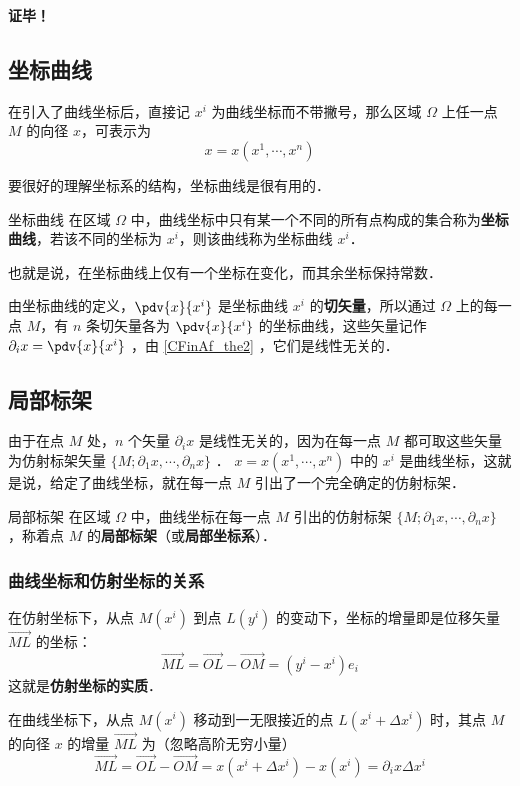 \textbf{证毕！}
\subsection{坐标曲线}
在引入了曲线坐标后，直接记 $x^i$ 为曲线坐标而不带撇号，那么区域 $\Omega$ 上任一点 $M$ 的向径 $x$，可表示为
\begin{equation}
x=x(x^1,\cdots,x^n)
\end{equation}

要很好的理解坐标系的结构，坐标曲线是很有用的．
\begin{definition}{坐标曲线}
在区域 $\Omega$ 中，曲线坐标中只有某一个不同的所有点构成的集合称为\textbf{坐标曲线}，若该不同的坐标为 $x^i$，则该曲线称为坐标曲线 $x^i$．
\end{definition}
也就是说，在坐标曲线上仅有一个坐标在变化，而其余坐标保持常数．

由坐标曲线的定义，$\pdv{x}{x^i}$ 是坐标曲线 $x^i$ 的\textbf{切矢量}，所以通过 $\Omega$ 上的每一点 $M$，有 $n$ 条切矢量各为 $\pdv{x}{x^i}$ 的坐标曲线，这些矢量记作 $\partial_i x=\pdv{x}{x^i}$ ，由 \autoref{CFinAf_the2} ，它们是线性无关的．
\subsection{局部标架}
由于在点 $M$ 处，$n$ 个矢量 $\partial_i x$ 是线性无关的，因为在每一点 $M$ 都可取这些矢量为仿射标架矢量 $\{M;\partial_1 x,\cdots,\partial_n x\}$ ． $x=x(x^1,\cdots,x^n)$ 中的 $x^i$ 是曲线坐标，这就是说，给定了曲线坐标，就在每一点 $M$ 引出了一个完全确定的仿射标架．
\begin{definition}{局部标架}
在区域 $\Omega$ 中，曲线坐标在每一点 $M$ 引出的仿射标架 $\{M;\partial_1 x,\cdots,\partial_n x\}$ ，称着点 $M$ 的\textbf{局部标架}（或\textbf{局部坐标系}）．
\end{definition} 
\subsubsection{曲线坐标和仿射坐标的关系}
在仿射坐标下，从点 $M(x^i)$ 到点 $L(y^i)$ 的变动下，坐标的增量即是位移矢量 $\overrightarrow{ML}$ 的坐标：
\begin{equation}
\overrightarrow{ML}=\overrightarrow{OL}-\overrightarrow{OM}=(y^i-x^i)e_i
\end{equation}
这就是\textbf{仿射坐标的实质}．

在曲线坐标下，从点 $M(x^i)$ 移动到一无限接近的点 $L(x^i+\Delta x^i)$ 时，其点 $M$ 的向径 $x$ 的增量 $\overrightarrow{ML}$ 为（忽略高阶无穷小量）
\begin{equation}\label{CFinAf_eq4}
\overrightarrow{ML}=\overrightarrow{OL}-\overrightarrow{OM}=x(x^i+\Delta x^i)-x(x^i)=\partial_i x\Delta x^i
\end{equation}

